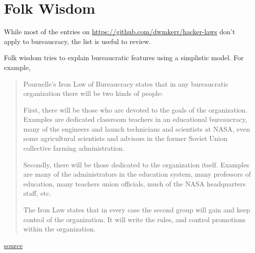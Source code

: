 \section{Folk Wisdom\label{sec:folk-wisdom}}

While most of the entries on
 \href{https://github.com/dwmkerr/hacker-laws}{https://github.com/dwmkerr/hacker-laws}
don't apply to bureaucracy, the list is useful to review. 


Folk wisdom tries to explain bureaucratic features using a simplistic model. For example,

\begin{quote}
Pournelle's Iron Law of Bureaucracy states that in any bureaucratic organization there will be two kinds of people:

First, there will be those who are devoted to the goals of the organization. Examples are dedicated classroom teachers in an educational bureaucracy, many of the engineers and launch technicians and scientists at NASA, even some agricultural scientists and advisors in the former Soviet Union collective farming administration.

Secondly, there will be those dedicated to the organization itself. Examples are many of the administrators in the education system, many professors of education, many teachers union officials, much of the NASA headquarters staff, etc.

The Iron Law states that in every case the second group will gain and keep control of the organization. It will write the rules, and control promotions within the organization.
\end{quote}
\href{https://www.jerrypournelle.com/reports/jerryp/iron.html}{source}

